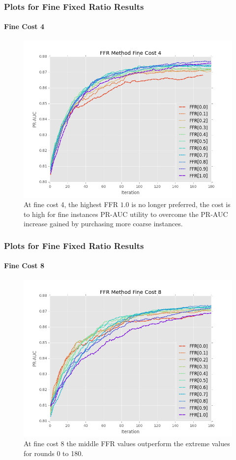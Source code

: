 \documentclass{beamer}
\begin{document}
\begin{frame}
    \frametitle{Plots for Fine Fixed Ratio Results}
    \framesubtitle{Fine Cost 4}
    \begin{figure}[!htb]
        \centering
        \includegraphics[width=0.7\columnwidth]{fig/ParamsFFR_PR_Cost4_rnds0_180}
        \caption{At fine cost 4, the highest FFR $1.0$ is no longer preferred, the
        cost is to high for fine instances PR-AUC utility to overcome the PR-AUC
        increase gained by purchasing more coarse instances.}
        \label{fig:ParamsFFR_PR_Cost4_rnds0_180}
    \end{figure}
\end{frame}
\begin{frame}
    \frametitle{Plots for Fine Fixed Ratio Results}
    \framesubtitle{Fine Cost 8}
    \begin{figure}[!htb]
        \centering
        \includegraphics[width=0.7\columnwidth]{fig/ParamsFFR_PR_Cost8_rnds0_180}
        \caption{At fine cost 8 the middle FFR values outperform the extreme values
        for rounds 0 to 180.}
        \label{fig:ParamsFFR_PR_Cost8_rnds0_180}
    \end{figure}
\end{frame}
\end{document}
